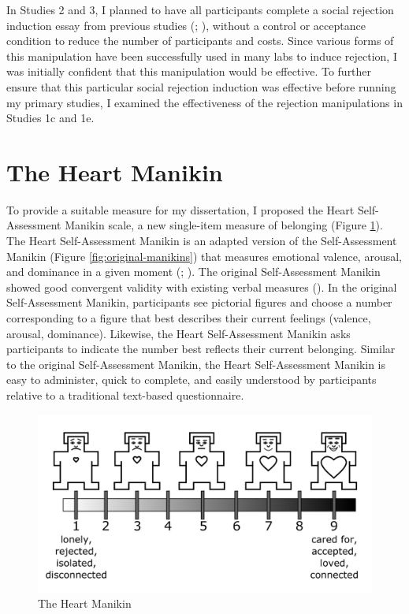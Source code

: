 \documentclass[
]{udthesis}
\begin{document}
In Studies 2 and 3, I planned to have all participants complete a social
rejection induction essay from previous studies (; ), without a control or acceptance condition to reduce the
number of participants and costs. Since various forms of this
manipulation have been successfully used in many labs to induce
rejection, I was initially confident that this manipulation would be
effective. To further ensure that this particular social rejection
induction was effective before running my primary studies, I examined
the effectiveness of the rejection manipulations in Studies 1c and 1e.

\section{The Heart Manikin}\label{the-heart-manikin}

To provide a suitable measure for my dissertation, I proposed the Heart
Self-Assessment Manikin scale, a new single-item measure of belonging
(Figure \ref{fig:heart-manikin}). The Heart Self-Assessment Manikin is
an adapted version of the Self-Assessment Manikin (Figure
\ref{fig:original-manikins}) that measures emotional valence, arousal,
and dominance in a given moment (; ). The original
Self-Assessment Manikin showed good convergent validity with existing
verbal measures (). In the original Self-Assessment
Manikin, participants see pictorial figures and choose a number
corresponding to a figure that best describes their current feelings (valence, arousal, dominance).
Likewise, the Heart Self-Assessment Manikin asks participants to
indicate the number best reflects their current belonging. Similar to
the original Self-Assessment Manikin, the Heart Self-Assessment Manikin
is easy to administer, quick to complete, and easily understood by
participants relative to a traditional text-based questionnaire.

\begin{figure}
\includegraphics[width=1\linewidth]{images/m-heart} \caption{The Heart Manikin}\label{fig:heart-manikin}
\end{figure}
\end{document}
